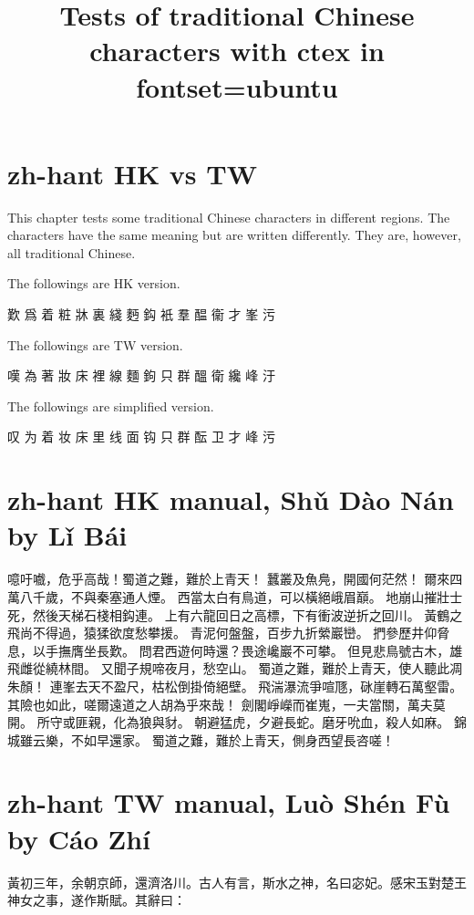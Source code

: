 \documentclass[a4paper,12pt, fontset=none, hyperref]{ctexbook}
\title{Tests of traditional Chinese characters with ctex in fontset=ubuntu}
\begin{document}
\maketitle
\tableofcontents

	\chapter{zh-hant HK vs TW}
	
		This chapter tests some traditional Chinese characters in different regions. The characters have the same meaning but are written differently. They are, however, all traditional Chinese.
	
		The followings are HK version.
		
		歎 爲 着 粧 牀 裏 綫 麪 鈎 衹 羣 醖 衞 才 峯 污
		
		The followings are TW version.
		  
		嘆 為 著 妝 床 裡 線 麵 鉤 只 群 醞 衛 纔 峰 汙
		
		The followings are simplified version.
		
		叹 为 着 妆 床 里 线 面 钩 只 群 酝 卫 才 峰 污

	\chapter{zh-hant HK manual, Shǔ Dào Nán by Lǐ Bái}
	
		噫吁嚱，危乎高哉！蜀道之難，難於上青天！
		蠶叢及魚鳧，開國何茫然！
		爾來四萬八千歲，不與秦塞通人煙。
		西當太白有鳥道，可以橫絕峨眉巔。
		地崩山摧壯士死，然後天梯石棧相鈎連。
		上有六龍回日之高標，下有衝波逆折之回川。
		黃鶴之飛尚不得過，猿猱欲度愁攀援。
		青泥何盤盤，百步九折縈巖巒。
		捫參歷井仰脅息，以手撫膺坐長歎。
		問君西遊何時還？畏途巉巖不可攀。
		但見悲鳥號古木，雄飛雌從繞林間。
		又聞子規啼夜月，愁空山。
		蜀道之難，難於上青天，使人聽此凋朱顏！
		連峯去天不盈尺，枯松倒掛倚絕壁。
		飛湍瀑流爭喧豗，砯崖轉石萬壑雷。
		其險也如此，嗟爾遠道之人胡為乎來哉！
		劍閣崢嶸而崔嵬，一夫當關，萬夫莫開。
		所守或匪親，化為狼與豺。
		朝避猛虎，夕避長蛇。磨牙吮血，殺人如麻。
		錦城雖云樂，不如早還家。
		蜀道之難，難於上青天，側身西望長咨嗟！

	\chapter{zh-hant TW manual, Luò Shén Fù by Cáo Zhí}
	
		黃初三年，余朝京師，還濟洛川。古人有言，斯水之神，名曰宓妃。感宋玉對楚王神女之事，遂作斯賦。其辭曰：
		
\end{document}
